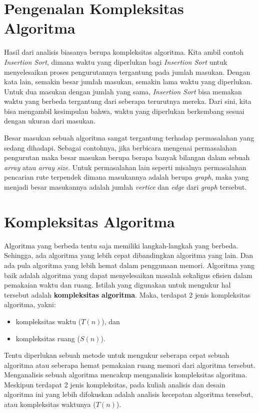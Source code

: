\section{Pengenalan Kompleksitas Algoritma}
Hasil dari analisis biasanya berupa kompleksitas algoritma. Kita ambil contoh \textit{Insertion Sort}, dimana waktu yang diperlukan bagi \textit{Insertion Sort} untuk menyelesaikan proses pengurutannya tergantung pada jumlah masukan. Dengan kata lain, semakin besar jumlah masukan, semakin lama waktu yang diperlukan. Untuk dua masukan dengan jumlah yang sama, \textit{Insertion Sort} bisa memakan waktu yang berbeda tergantung dari seberapa terurutnya mereka. Dari sini, kita bisa mengambil kesimpulan bahwa, waktu yang diperlukan berkembang sesuai dengan ukuran dari masukan.

Besar masukan sebuah algoritma sangat tergantung terhadap permasalahan yang sedang dihadapi. Sebagai contohnya, jika berbicara mengenai permasalahan pengurutan maka besar masukan berupa berapa banyak bilangan dalam sebuah \textit{array} atau \textit{array size}. Untuk permasalahan lain seperti misalnya permasalahan pencarian rute terpendek dimana masukannya adalah berupa \textit{graph}, maka yang menjadi besar masukannya adalah jumlah \textit{vertice} dan \textit{edge} dari \textit{graph} tersebut. 

\section{Kompleksitas Algoritma}
Algoritma yang berbeda tentu saja memiliki langkah-langkah yang berbeda. Sehingga, ada algoritma yang lebih cepat dibandingkan algoritma yang lain. Dan ada pula algoritma yang lebih hemat dalam penggunaan memori. Algoritma yang baik adalah algoritma yang dapat menyelesaikan masalah  sekaligus efisien dalam pemakaian waktu dan ruang. Istilah yang digunakan untuk mengukur hal tersebut adalah \textbf{kompleksitas algoritma}. Maka, terdapat 2 jenis kompleksitas algoritma, yakni:

\begin{itemize}
    \item kompleksitas waktu ($T(n)$), dan
    \item kompleksitas ruang ($S(n)$).
\end{itemize}

Tentu diperlukan sebuah metode untuk mengukur seberapa cepat sebuah algoritma atau seberapa hemat pemakaian ruang memori dari algoritma tersebut. Menganalisis sebuah algoritma mencakup menganalisis kompleksitas algoritma. Meskipun terdapat 2 jenis kompleksitas, pada kuliah analisis dan desain algoritma ini yang lebih difokuskan adalah analisis kecepatan algoritma tersebut, atau kompleksitas waktunya ($T(n)$).

